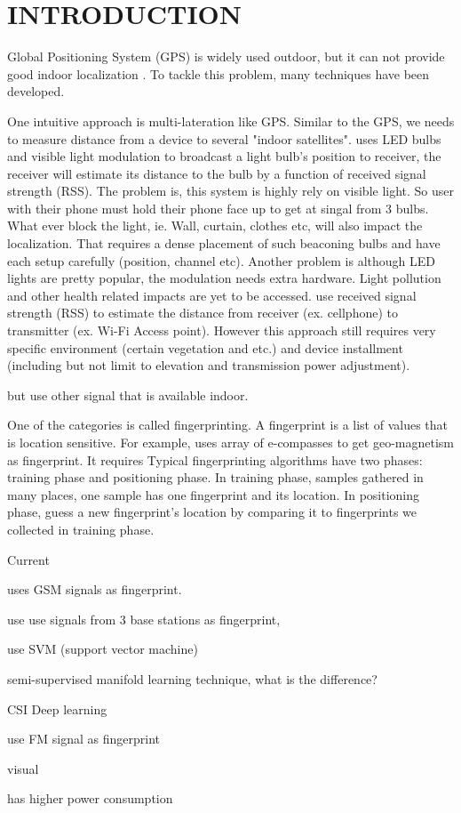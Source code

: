 \chapter{INTRODUCTION}

Global Positioning System (GPS) is widely used outdoor, but it can not provide good indoor localization \cite{pulkkinen2011semi, varshavsky2007gsm}. To tackle this problem, many techniques have been developed. 

One intuitive approach is multi-lateration like GPS. Similar to the GPS, we needs to measure distance from a device to several "indoor satellites". \cite{hu2013pharos} uses LED bulbs and visible light modulation to broadcast a light bulb's position to receiver, the receiver will estimate its distance to the bulb by a function of received signal strength (RSS). The problem is, this system is highly rely on visible light. So user with their phone must hold their phone face up to get at singal from 3 bulbs. What ever block the light, ie. Wall, curtain, clothes etc, will also impact the localization. That requires a dense placement of such beaconing bulbs and have each setup carefully (position, channel etc). Another problem is although LED lights are pretty popular, the modulation needs extra hardware. Light pollution and other health related impacts are yet to be accessed.  \cite{whitehouse2007practical} use received signal strength (RSS) to estimate the distance from receiver (ex. cellphone) to transmitter (ex. Wi-Fi Access point). However this approach still requires very specific environment (certain vegetation and etc.) and device installment (including but not limit to elevation and transmission power adjustment). 

but use other signal that is available indoor.

 
One of the categories is called fingerprinting. A fingerprint is a list of values that is location sensitive. For example, \cite{chung2011indoor} uses array of e-compasses to get geo-magnetism as fingerprint. It requires  Typical fingerprinting algorithms have two phases: training phase and positioning phase. In training phase, samples gathered in many places, one sample has one fingerprint and its location. In positioning phase, guess a new fingerprint's location by comparing it to fingerprints we collected in training phase. 

Current 


\cite{varshavsky2007gsm} uses GSM signals as fingerprint. 

\cite{bahl2000radar} use use signals from 3 base stations as fingerprint,

\cite{brunato2005statistical} use SVM (support vector machine)

\cite{pulkkinen2011semi}semi-supervised manifold learning technique, what is the difference? 

CSI Deep learning

\cite{chen2012fm} use FM signal as fingerprint

visual

has higher power consumption